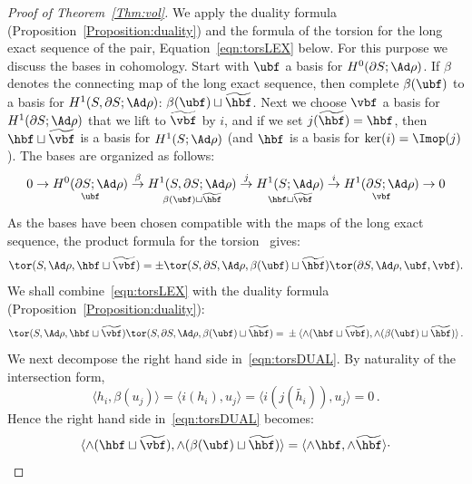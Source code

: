 \begin{proof}[Proof of Theorem~\ref{Thm:vol}]
We apply the duality formula (Proposition~\ref{Proposition:duality}) and the formula of the torsion for the long exact sequence of the pair, Equation~\eqref{eqn:torsLEX} below. For this purpose we discuss the bases in cohomology. Start with $\ubf$ a basis for $H^0(\partial S;\Ad\rho)$. If $\beta$ denotes the connecting map of the long exact sequence, then complete $\beta(\ubf)$ to a basis for $H^1(S,\partial S;\Ad\rho)$: $\beta (\ubf) \sqcup \widetilde{\hbf} $. Next we choose $\vbf$ a basis for $H^1(\partial S;\Ad\rho)$ that we lift to $\widetilde{\vbf}$ by $i$, and if we set $ j(\widetilde{\hbf})=\hbf $, then $\hbf\sqcup \widetilde{\vbf }$ is a basis for $H^1(S;\Ad\rho)$ (and $\hbf$ is a basis for $\ker(i)=\Imop(j)$). The bases are organized as follows:
\begin{equation}\label{eqn:LEX}
0\to \underset { {\ubf}} {H^0(\partial S;\Ad\rho)}
\overset\beta\to\underset { {\beta(\ubf)}\sqcup \widetilde{\hbf} } {H^1(S,\partial S;\Ad\rho)}
\overset j\to \underset{ {\hbf}\sqcup \widetilde{ \vbf } }{H^1(S;\Ad\rho)}\overset i\to \underset{ \vbf}{H^1(\partial S;\Ad\rho)}\to 0
\end{equation}
As the bases have been chosen compatible with the maps of the long exact sequence, the product formula for the torsion~\cite{MilnorBullAMS} gives:
\begin{equation}\label{eqn:torsLEX}
\tor(S,\Ad\rho, \hbf \sqcup \widetilde{\vbf}) =\pm
\tor(S,\partial S,\Ad\rho, \beta (\ubf) \sqcup \widetilde{\hbf})
\tor(\partial S,\Ad\rho, \ubf, \vbf).
\end{equation}
We shall combine~\eqref{eqn:torsLEX} with the duality formula (Proposition~\ref{Proposition:duality}):
\begin{equation}\label{eqn:torsDUAL}
\tor(S,\Ad\rho, \hbf \sqcup \widetilde{\vbf})
\tor(S,\partial S,\Ad\rho, \beta (\ubf) \sqcup \widetilde{\hbf}) =\\
\pm \langle\wedge (\hbf \sqcup\widetilde{ \vbf}), \wedge (\beta (\ubf) \sqcup \widetilde{\hbf})
\rangle\,.
\end{equation}
We next decompose the right hand side in~\eqref{eqn:torsDUAL}. By naturality of the intersection form,
\[
\langle {{h_i }}, \beta(u_j) \rangle =
\langle i({{h_i }}), u_j \rangle =
\langle i(j(\widetilde{{{h_i }}})), u_j \rangle = 0\,.
\]
Hence the right hand side in~\eqref{eqn:torsDUAL} becomes:
\[
\langle
\wedge(\hbf\sqcup \widetilde{\vbf}), \wedge (\beta (\ubf) \sqcup \widetilde{\hbf})
\rangle=
\langle \wedge{\hbf}, \wedge\widetilde{{\hbf}} \rangle \cdot
\]
\end{proof}
